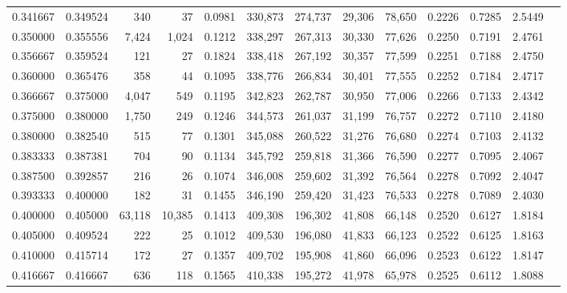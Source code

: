 \begin{tabular}{rrrrrrrrrrrrr}
0.341667 & 0.349524 &    340 &     37 &                                     0.0981 & 330,873 & 274,737 &  29,306 &  78,650 & 0.2226 & 0.7285 & 2.5449 \\
0.350000 & 0.355556 &  7,424 &  1,024 &                                     0.1212 & 338,297 & 267,313 &  30,330 &  77,626 & 0.2250 & 0.7191 & 2.4761 \\
0.356667 & 0.359524 &    121 &     27 &                                     0.1824 & 338,418 & 267,192 &  30,357 &  77,599 & 0.2251 & 0.7188 & 2.4750 \\
0.360000 & 0.365476 &    358 &     44 &                                     0.1095 & 338,776 & 266,834 &  30,401 &  77,555 & 0.2252 & 0.7184 & 2.4717 \\
0.366667 & 0.375000 &  4,047 &    549 &                                     0.1195 & 342,823 & 262,787 &  30,950 &  77,006 & 0.2266 & 0.7133 & 2.4342 \\
0.375000 & 0.380000 &  1,750 &    249 &                                     0.1246 & 344,573 & 261,037 &  31,199 &  76,757 & 0.2272 & 0.7110 & 2.4180 \\
0.380000 & 0.382540 &    515 &     77 &                                     0.1301 & 345,088 & 260,522 &  31,276 &  76,680 & 0.2274 & 0.7103 & 2.4132 \\
0.383333 & 0.387381 &    704 &     90 &                                     0.1134 & 345,792 & 259,818 &  31,366 &  76,590 & 0.2277 & 0.7095 & 2.4067 \\
0.387500 & 0.392857 &    216 &     26 &                                     0.1074 & 346,008 & 259,602 &  31,392 &  76,564 & 0.2278 & 0.7092 & 2.4047 \\
0.393333 & 0.400000 &    182 &     31 &                                     0.1455 & 346,190 & 259,420 &  31,423 &  76,533 & 0.2278 & 0.7089 & 2.4030 \\
0.400000 & 0.405000 & 63,118 & 10,385 &                                     0.1413 & 409,308 & 196,302 &  41,808 &  66,148 & 0.2520 & 0.6127 & 1.8184 \\
0.405000 & 0.409524 &    222 &     25 &                                     0.1012 & 409,530 & 196,080 &  41,833 &  66,123 & 0.2522 & 0.6125 & 1.8163 \\
0.410000 & 0.415714 &    172 &     27 &                                     0.1357 & 409,702 & 195,908 &  41,860 &  66,096 & 0.2523 & 0.6122 & 1.8147 \\
0.416667 & 0.416667 &    636 &    118 &                                     0.1565 & 410,338 & 195,272 &  41,978 &  65,978 & 0.2525 & 0.6112 & 1.8088 \\

\end{tabular}
